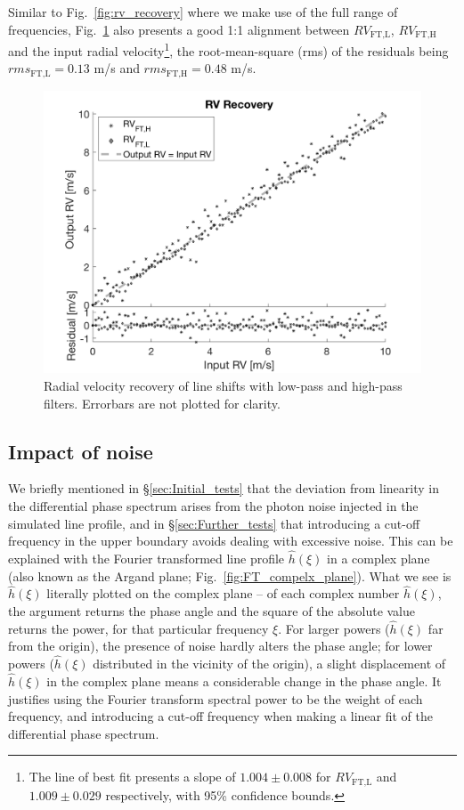 Similar to Fig.~\ref{fig:rv_recovery} where we make use of the full range of frequencies, Fig.~\ref{fig:rv_recovery_LH} also presents a good 1:1 alignment between $RV_\text{FT,L}$, $RV_\text{FT,H}$ and the input radial velocity\footnote{The line of best fit presents a slope of $1.004\pm0.008$ for $RV_\text{FT,L}$ and $1.009\pm0.029$ respectively, with 95\% confidence bounds.}, the root-mean-square (rms) of the residuals being $rms_\text{FT,L} = 0.13$ m/s and $rms_\text{FT,H} = 0.48$ m/s. 

\begin{figure}[tbp]
\centering
\includegraphics[width = 0.7 \linewidth]
{./Figures/Methods/5-LINE_SHIFT_ONLY-HL.png}
\caption[Low-pass and high-pass radial velocities]
{Radial velocity recovery of line shifts with low-pass and high-pass filters. Errorbars are not plotted for clarity.}
\label{fig:rv_recovery_LH}
\end{figure} 
\FloatBarrier

\subsection{Impact of noise}
We briefly mentioned in \S\ref{sec:Initial_tests} that the deviation from linearity in the differential phase spectrum arises from the photon noise injected in the simulated line profile, and in \S\ref{sec:Further_tests} that introducing a cut-off frequency in the upper boundary avoids dealing with excessive noise. This can be explained with the Fourier transformed line profile $\hat{h}(\xi)$ in a complex plane (also known as the Argand plane; Fig.~\ref{fig:FT_compelx_plane}). What we see is $\hat{h}(\xi)$ literally plotted on the complex plane -- of each complex number $\hat{h}(\xi)$, the argument returns the phase angle and the square of the absolute value returns the power, for that particular frequency $\xi$. For larger powers ($\hat{h}(\xi)$ far from the origin), the presence of noise hardly alters the phase angle; for lower powers ($\hat{h}(\xi)$ distributed in the vicinity of the origin), a slight displacement of $\hat{h}(\xi)$ in the complex plane means a considerable change in the phase angle. It justifies using the Fourier transform spectral power to be the weight of each frequency, and introducing a cut-off frequency when making a linear fit of the differential phase spectrum. 

